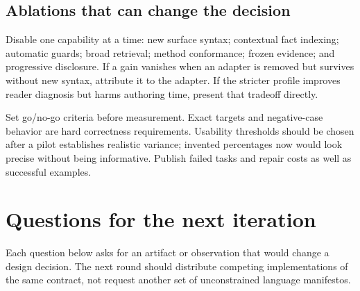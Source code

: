 \documentclass[11pt,letterpaper]{article}
\begin{document}
\subsection{Ablations that can change the decision}
Disable one capability at a time: new surface syntax; contextual fact indexing;
automatic guards; broad retrieval; method conformance; frozen evidence; and
progressive disclosure. If a gain vanishes when an adapter is removed but survives
without new syntax, attribute it to the adapter. If the stricter profile improves
reader diagnosis but harms authoring time, present that tradeoff directly.

Set go/no-go criteria before measurement. Exact targets and negative-case behavior
are hard correctness requirements. Usability thresholds should be chosen after
a pilot establishes realistic variance; invented percentages now would look
precise without being informative. Publish failed tasks and repair costs as well
as successful examples.

\section{Questions for the next iteration}\label{sec:questions}
Each question below asks for an artifact or observation that would change a design
decision. The next round should distribute competing implementations of the same
contract, not request another set of unconstrained language manifestos.
\end{document}

